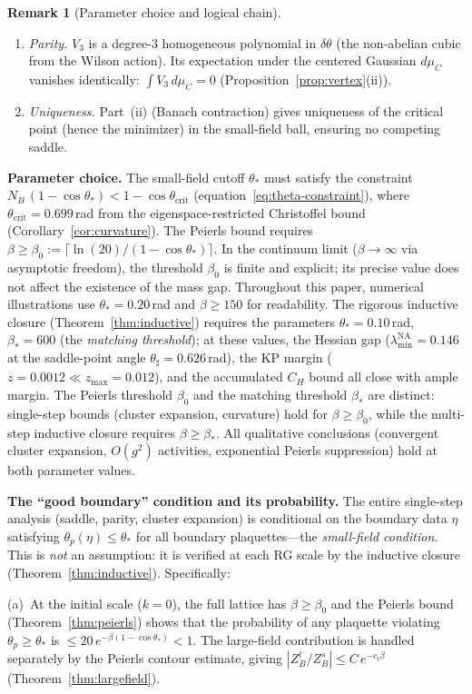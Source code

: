 \documentclass[11pt]{article}
\theoremstyle{definition}
\newtheorem{remark}[theorem]{Remark}
\begin{document}
\begin{remark}[Parameter choice and logical chain]
\begin{enumerate}
\item \emph{Parity.}  $V_3$ is a degree-3 homogeneous
polynomial in $\delta\theta$ (the non-abelian cubic from the
Wilson action).  Its expectation under the centered Gaussian
$d\mu_C$ vanishes identically:
$\int V_3\,d\mu_C=0$ (Proposition~\ref{prop:vertex}(ii)).

\item \emph{Uniqueness.}  Part~(ii) (Banach contraction) gives
uniqueness of the critical point (hence the minimizer) in the
small-field ball, ensuring no competing saddle.
\end{enumerate}

\textbf{Parameter choice.}
The small-field cutoff $\theta_*$ must satisfy the constraint
$N_B\,(1-\cos\theta_*)<1-\cos\theta_{\mathrm{crit}}$
(equation~\eqref{eq:theta-constraint}), where
$\theta_{\mathrm{crit}}=0.699$\,rad from the eigenspace-restricted
Christoffel bound (Corollary~\ref{cor:curvature}).
The Peierls bound requires
$\beta\ge\beta_0:=\lceil\ln(20)/(1-\cos\theta_*)\rceil$.
In the continuum limit ($\beta\to\infty$ via asymptotic freedom),
the threshold $\beta_0$ is finite and explicit; its precise
value does not affect the existence of the mass gap.
Throughout this paper, numerical illustrations use
$\theta_*=0.20$\,rad and $\beta\ge 150$ for readability.
The rigorous inductive closure
(Theorem~\ref{thm:inductive}) requires the
parameters $\theta_*=0.10$\,rad,
$\beta_*=600$ (the \emph{matching threshold}); at these values,
the Hessian gap ($\lambda_{\min}^{\mathrm{NA}}=0.146$ at the
saddle-point angle $\theta_\sharp=0.626$\,rad),
the KP margin ($z=0.0012\ll z_{\max}=0.012$), and
the accumulated $C_H$ bound all close
with ample margin.
The Peierls threshold $\beta_0$ and the matching
threshold $\beta_*$ are distinct: single-step bounds
(cluster expansion, curvature) hold for
$\beta\ge\beta_0$, while the multi-step inductive
closure requires $\beta\ge\beta_*$.
All qualitative conclusions (convergent cluster expansion,
$O(g^2)$ activities, exponential Peierls suppression) hold
at both parameter values.

\textbf{The ``good boundary'' condition and its probability.}
The entire single-step analysis (saddle, parity, cluster expansion)
is conditional on the boundary data $\eta$ satisfying
$\theta_p(\eta)\le\theta_*$ for all boundary plaquettes---the
\emph{small-field condition}.  This is \emph{not} an assumption:
it is verified at each RG scale by the inductive closure
(Theorem~\ref{thm:inductive}).  Specifically:

(a)~At the initial scale ($k=0$), the full lattice has $\beta\ge\beta_0$
and the Peierls bound (Theorem~\ref{thm:peierls}) shows that the
probability of any plaquette violating $\theta_p\ge\theta_*$ is
$\le 20\,e^{-\beta(1-\cos\theta_*)}<1$.  The large-field
contribution is handled separately by the Peierls contour estimate,
giving $|Z_B^l/Z_B^s|\le C\,e^{-c_l\beta}$
(Theorem~\ref{thm:largefield}).


\end{remark}
\end{document}
